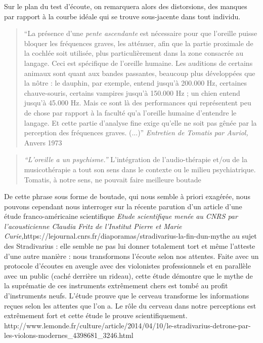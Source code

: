 \documentclass[12pt,french]{report}
\makeatletter
\let\SF@@footnote\footnote
\def\footnote{\ifx\protect\@typeset@protect
    \expandafter\SF@@footnote
  \else
    \expandafter\SF@gobble@opt
  \fi
}
\edef\SF@gobble@opt{\noexpand\protect
  \expandafter\noexpand\csname SF@gobble@opt \endcsname}
\makeatother
\begin{document}
Sur le plan du test d\textquoteright écoute,\emph{ }on remarquera
alors des distorsions, des manques\emph{ }par rapport à la courbe
idéale qui se trouve sous-jacente dans tout individu. 
\begin{quotation}
``La présence d'une \emph{pente ascendante} est nécessaire pour que
l'oreille puisse bloquer les fréquences graves, les atténuer, afin
que la partie proximale de la cochlée soit utilisée, plus particulièrement
dans la zone consacrée au langage. Ceci est spécifique de l'oreille
humaine. Les auditions de certains animaux sont quant aux bandes passantes,
beaucoup plus développées que la nôtre : le dauphin, par exemple,
entend jusqu\textquoteright à 200.000 Hz, certaines chauve-souris,
certains vampires jusqu'à 150.000 Hz ; un chien entend jusqu'à 45.000
Hz. Mais ce sont là des performances qui représentent peu de chose
par rapport à la faculté qu'a l'oreille humaine d\textquoteright entendre
le langage. Et cette partie d'analyse fine exige qu'elle ne soit pas
gênée par la perception des fréquences graves. (...)''\footnote{\emph{Entretien de Tomatis par Auriol,} Anvers 1973}
\end{quotation}
\begin{quote}
\emph{``L'oreille a un psychisme.''} 
L'intégration de l'audio-thérapie et/ou de la musicothérapie a tout son sens dans le contexte ou le milieu psychiatrique. Tomatis, à notre sens, ne pouvait faire meilleure boutade
\end{quote}
De cette phrase sous forme de boutade, qui nous semble à priori exagérée,
nous pouvons cependant nous interroger sur la récente parution d'un
article d'une étude franco-américaine scientifique \footnote{\emph{Etude scientifique menée au CNRS par l'acousticienne Claudia
Fritz de l'Institut Pierre et Marie Curie,}https://lejournal.cnrs.fr/diaporamas/stradivarius-la-fin-dun-mythe} au sujet des Stradivarius : elle semble ne pas lui donner totalement
tort et même l'atteste d'une autre manière : nous transformons l'écoute
selon nos attentes. Faite avec un protocole d'écoutes en aveugle avec
des violonistes professionnels et en parallèle avec un public (caché
derrière un rideau), cette étude démontre que le mythe de la suprématie
de ces instruments extrêmement chers est tombé au profit d'instruments
neufs. L'étude prouve que le cerveau transforme les informations reçues
selon les attentes que l'on a. Le rôle du cerveau dans notre perceptions
est extrêmement fort et cette étude le prouve scientifiquement. \footnote{http://www.lemonde.fr/culture/article/2014/04/10/le-stradivarius-detrone-par-les-violons-modernes\_4398681\_3246.html }
\end{document}
